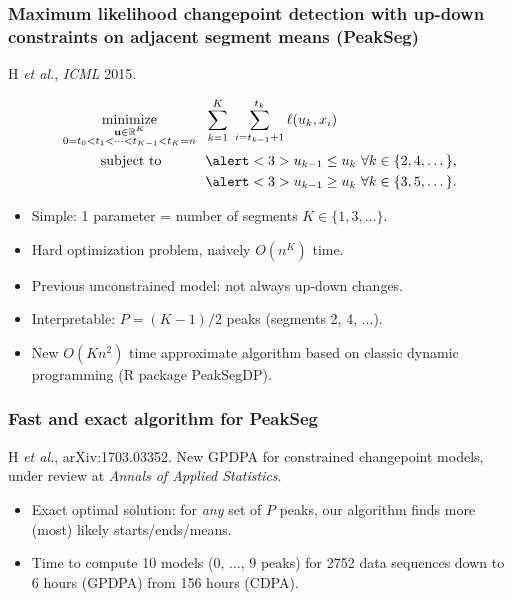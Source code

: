 \documentclass{beamer}
\DeclareMathOperator*{\minimize}{minimize}
\newcommand{\RR}{\mathbb R}
\newcommand{\algo}[1]{\textcolor{#1}{#1}}
\begin{document}
\begin{frame}
  \frametitle{Maximum likelihood changepoint detection with up-down constraints on adjacent segment means (PeakSeg)}
H {\it et al.}, {\it ICML} 2015. 
   
\vskip -1.5cm
\begin{align*}
    \minimize_{\substack{
  \mathbf u\in\RR^{K}
\\
   0=t_0<t_1<\cdots<t_{K-1}<t_K=n
  }} &\ \ 
    \sum_{k=1}^K\  \sum_{i=t_{k-1}+1}^{t_k} \ell( u_k,  x_i) 
  \label{PeakSegPDPA}
\\
      \text{subject to \hskip 0.75cm} &\ \ \alert<3>{u_{k-1} \leq u_k\ \forall k\in\{2,4,\dots\},}
  \nonumber\\
  &\ \ \alert<3>{u_{k-1} \geq u_k\ \forall k\in\{3,5,\dots\}.}
  \nonumber 
\end{align*}
\vskip -0.4cm
\begin{itemize}  
\item Simple: 1 parameter = number of segments $K\in\{1,3,\dots\}$.
\item Hard optimization problem, naively $O(n^K)$ time.
\item \alert<2>{Previous unconstrained model: not always up-down changes.}
\item \alert<3>{Interpretable: $P=(K-1)/2$ peaks (segments 2, 4, ...).}
\item New $O(Kn^2)$ time approximate algorithm based on classic
  dynamic programming (R package PeakSegDP).
\end{itemize}
\end{frame} 


\begin{frame}
  \frametitle{Fast and exact algorithm for PeakSeg}
  H {\it et al.}, arXiv:1703.03352. New GPDPA for 
  constrained changepoint models, under review at {\it Annals of
    Applied Statistics}.
  \begin{itemize}
  \item Exact optimal solution: for \emph{any} set of $P$ peaks, our
    algorithm finds more (most) likely starts/ends/means.
  \item Time to compute 10 models (0, ..., 9 peaks) for 2752 data
    sequences down to \textcolor{GPDPA}{6 hours (GPDPA)} from
    \textcolor{CDPA}{156 hours (CDPA)}.
  \end{itemize}

  

\end{frame}
\end{document}
